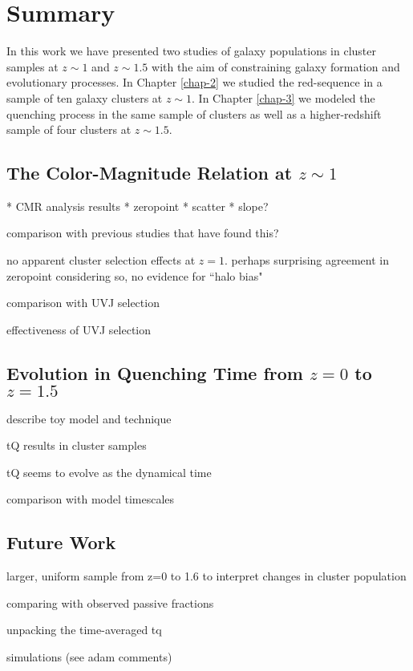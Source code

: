 \chapter{Summary}

In this work we have presented two studies of galaxy populations in cluster samples at $z\sim1$ and $z\sim1.5$ with the aim of constraining galaxy formation and evolutionary processes.
In Chapter \ref{chap-2} we studied the red-sequence in a sample of ten galaxy clusters at $z\sim1$.
In Chapter \ref{chap-3} we modeled the quenching process in the same sample of clusters as well as a higher-redshift sample of four clusters at $z\sim1.5$.

\section{The Color-Magnitude Relation at $z\sim1$}

* CMR analysis results
  * zeropoint
  * scatter
  * slope?

comparison with previous studies that have found this?

no apparent cluster selection effects at $z=1$.
perhaps surprising agreement in zeropoint considering
so, no evidence for ``halo bias"

comparison with UVJ selection

effectiveness of UVJ selection

\section{Evolution in Quenching Time from $z=0$ to $z=1.5$}

describe toy model and technique

tQ results in cluster samples

tQ seems to evolve as the dynamical time

comparison with model timescales

\section{Future Work}

larger, uniform sample from z=0 to 1.6 to interpret changes in cluster population

comparing with observed passive fractions

unpacking the time-averaged tq

simulations (see adam comments)
